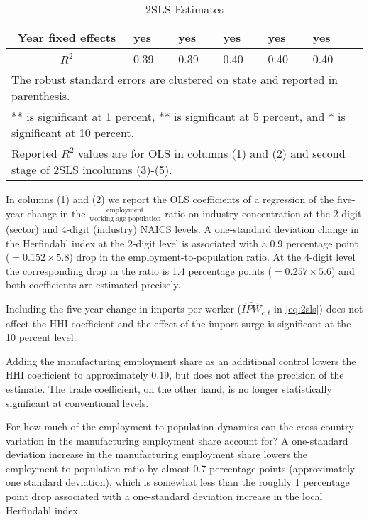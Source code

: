 \documentclass[onehalfspacing,11pt]{article}
\begin{document}
\begin{table}
\begin{tabularx}{\textwidth}{ c *{6}{X} }
 \midrule
 Year fixed effects & yes & yes & yes & yes & yes \\
    \midrule
    \midrule
 $R^2$ & 0.39 & 0.39 & 0.40 & 0.40 & 0.40 \\
 \bottomrule
 \multicolumn{6}{l}{{\small The robust standard errors are clustered on state and reported in parenthesis.}} \\
 \multicolumn{6}{l}{{\small *** is significant at 1 percent, ** is significant at 5 percent, and * is significant at 10 percent.}} \\
 \multicolumn{6}{l}{{\small Reported $R^2$ values are for OLS in columns (1) and (2) and second stage of 2SLS incolumns (3)-(5).}}
    \end{tabularx}
  \caption{2SLS Estimates}\label{tab:2sls}
\end{table}

In columns (1) and (2) we report the OLS coefficients of a regression of the five-year change in the $\frac{\textrm{employment}}{\textrm{working age population}}$ ratio on industry concentration at the 2-digit (sector) and 4-digit (industry) NAICS levels. A one-standard deviation change in the Herfindahl index at the 2-digit level is associated with a 0.9 percentage point ($=0.152  \times 5.8$) drop in the employment-to-population ratio. At the 4-digit level the corresponding drop in the ratio is 1.4 percentage points ($=0.257 \times 5.6$) and both coefficients are estimated precisely.

Including the five-year change in imports per worker ($\widehat{IPW}_{c,t}$ in \ref{eq:2sls}) does not affect the HHI coefficient and the effect of the import surge is significant at the 10 percent level.

Adding the manufacturing employment share as an additional control lowers the HHI coefficient to approximately 0.19, but does not affect the precision of the estimate. The trade coefficient, on the other hand, is no longer statistically significant at conventional levels.

For how much of the employment-to-population dynamics can the cross-country variation in the manufacturing employment share account for? A one-standard deviation increase in the manufacturing employment share lowers the employment-to-population ratio by almost 0.7 percentage points (approximately one standard deviation), which is somewhat less than the roughly 1 percentage point drop associated with a one-standard deviation increase in the local Herfindahl index.
\end{document}
